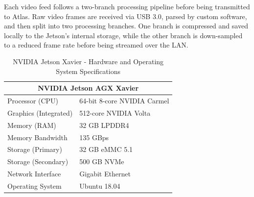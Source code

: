 \documentclass{erauthesis}
\begin{document}
Each video feed follows a two-branch processing pipeline before being transmitted to Atlas.  
Raw video frames are received via USB 3.0, parsed by custom software, and then split into two processing branches. 
One branch is compressed and saved locally to the Jetson's internal storage, while the other branch is down-sampled to a reduced frame rate before being streamed over the \ac{LAN}.%





\begin{table}[htpb]
\centering
\begin{tabular}{ll}
\hline
\multicolumn{2}{c}{NVIDIA Jetson AGX Xavier} \\
\hline
\hline
Processor (CPU) & 64-bit 8-core NVIDIA Carmel \\
Graphics (Integrated) & 512-core NVIDIA Volta \\
Memory (RAM) & 32 GB LPDDR4 \\
Memory Bandwidth & 135 GBps \\
Storage (Primary) & 32 GB eMMC 5.1 \\
Storage (Secondary) & 500 GB NVMe \\
Network Interface & Gigabit Ethernet \\
Operating System & Ubuntu 18.04 \\
\hline
\end{tabular}
\caption{NVIDIA Jetson Xavier - Hardware and Operating System Specifications}
\label{table:Xavier_hardware}
\end{table}
\end{document}
